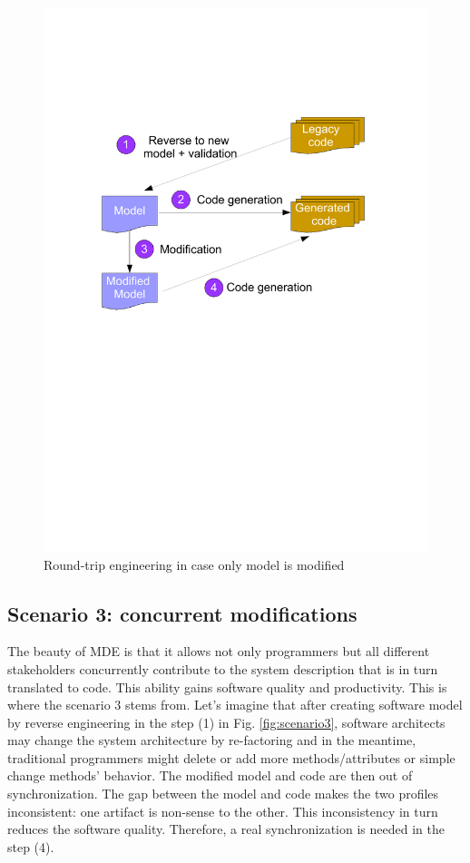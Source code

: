 \begin{figure}
\centering
\includegraphics[height = 0.20\textheight, trim = 90 370 60 170, clip]{figures/scenario2}
\caption{\label{fig:scenario2}Round-trip engineering in case only model is modified} 
\end{figure}


\subsection{Scenario 3: concurrent modifications}
\label{scenario3}
The beauty of MDE is that it allows not only programmers but all different stakeholders concurrently contribute to the system description that is in turn translated to code. This ability gains software quality and productivity. This is where the scenario 3 stems from. Let's imagine that after creating software model by reverse engineering in the step (1) in Fig. \ref{fig:scenario3}, software architects may change the system architecture by re-factoring and in the meantime, traditional programmers might delete or add more methods/attributes or simple change methods' behavior. The modified model and code are then out of synchronization. The gap between the model and code makes the two profiles inconsistent: one artifact is non-sense to the other. This inconsistency in turn reduces the software quality. Therefore, a real synchronization is needed in the step (4). 

